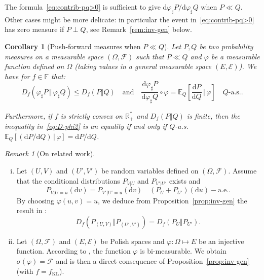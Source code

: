 \documentclass[12pt]{article}
\newcommand{\ce}{{\mathcal E}}
\newcommand{\cf}{{\mathcal F}}
\newcommand{\E}{{\mathbb E}}
\newcommand{\F}{{\mathbb F}}
\newcommand{\R}{{\mathbb R}}
\newcommand{\rd}{\mathrm{d}}
\theoremstyle{plain}
\newtheorem{cor}[theo]{Corollary}
\theoremstyle{remark}
\newtheorem{rem}{Remark}
\begin{document}
The     formula~\eqref{eq:contrib-pq>0}     is  sufficient   to     give
$ {\rd \varphi_\sharp P}/{\rd \varphi _\sharp  Q}$ when $P \ll Q$. Other
cases   might    be   more    delicate:   in   particular    the   event
in~\eqref{eq:contrib-pq>0}  has   zero  measure  if  $P\perp   Q$,  see
Remark~\ref{rem:inv-gen} below.

\begin{cor}[Push-forward measures when $P \ll Q$]
  \label{cor:increase-Df}
  Let $P,Q$ be  two probability measures  on a  measurable space
  $(\Omega,  \cf)$ such that $P \ll Q$  and  $\varphi$ be  a measurable  function defined  on
  $\Omega$ (taking values in a  general measurable space $(E, \ce)$).
 We have for $f\in \F$ that:
\begin{equation}
   \label{eq:D-phi2}
   D_f(\varphi_\sharp P \, \Vert \, \varphi_ \sharp Q) \leq
   D_f(P    \Vert Q)
\quad\text{and}\quad
  \frac{\rd\varphi_\sharp P}{\rd \varphi_\sharp Q}\circ \varphi =
  \E_Q\left[\frac{\rd
         P}{\rd Q}\,|\, \varphi\right] \quad\text{$Q$-a.s..}
\end{equation}

    Furthermore,   if   $f$   is   strictly   convex   on   $\R_+^*$   and
    $ D_f(P \Vert Q)$ is finite, then the inequality in~\eqref{eq:D-phi2} is
    an equality if and only if  $Q$-a.s.\ $ \E_Q\left[(\rd
         P/ \rd Q) \,|\, \varphi\right]=\rd
         P/ \rd Q$.
\end{cor}


\begin{rem}[On related work]
   \label{rem:related-work}
  \begin{enumerate}[(i)]
  \item \label{item:div-kernel} Let $  (U,V)$ and  $ (U',V')$  be random  variables defined  on
    $(\Omega,   \cf)$.   Assume   that  the   conditional  distributions
    $P_{V|U}$         and         $P_{V'|U'}$         exists         and
    \begin{equation}
        \label{eq:kernel-eqal}
        P_{V|U=u}(\rd     v)=P_{V'|U'=u}(\rd      v)
        \quad (P_U+P_{U'})(\rd u)-\text{a.e.}.
    \end{equation}
         By     choosing
    $\varphi(u,v)  = u$,  we deduce  from Proposition~\ref{prop:inv-gen}
    the result in     \citet[Proposition~7.2]{polyanskiy2025information}:
    $$
    D_f(P_{(U,V)}\Vert  P_{(U',V')}) =  D_f(P_U \Vert  P_{U'}).
    $$
  \item     \label{it:phi-inj}      Let
   $(\Omega,  \cf)$ and $(E, \ce)$  be Polish spaces
    and $\varphi:\Omega \mapsto E$  be an injective  function. According
    to \cite{purves1966bimeasurable}, the function $\varphi$ is
    bi-measurable.      We      obtain     $\sigma(\varphi)=\cf$      and
    \citet[Corollary~2.18]{polyanskiy2025information} is then  a direct consequence
    of      Proposition~\ref{prop:inv-gen}   (with  $f=f_\mathrm{KL}$).
  \end{enumerate}
\end{rem}
\end{document}

